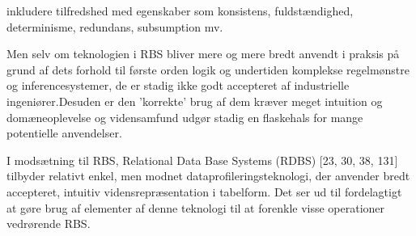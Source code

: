 inkludere tilfredshed med egenskaber som konsistens, fuldstændighed, determinisme,
redundans, subsumption mv. %

Men selv om teknologien i RBS bliver
mere og mere bredt anvendt i praksis på grund af dets forhold til første orden
logik og undertiden komplekse regelmønstre og inferencesystemer, de er stadig ikke godt accepteret af industrielle ingeniører.Desuden er den 'korrekte' brug af dem kræver meget intuition og domæneoplevelse og vidensamfund
udgør stadig en flaskehals for mange potentielle anvendelser.

I modsætning til RBS, Relational Data Base Systems (RDBS) [23, 30, 38, 131]
tilbyder relativt enkel, men modnet dataprofileringsteknologi, der anvender
bredt accepteret, intuitiv vidensrepræsentation i tabelform. Det ser ud til
fordelagtigt at gøre brug af elementer af denne teknologi til at forenkle visse
operationer vedrørende RBS.


%
%
%

